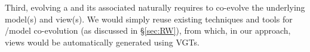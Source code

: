 Third, evolving a \metamodel and its associated \viewtypes naturally requires to
co-evolve the underlying model(s) and view(s). We would simply reuse existing 
techniques and tools for \metamodel/model co-evolution (as discussed in \S \ref{sec:RW}),
from which, in our approach, views would be automatically generated using VGTs.

